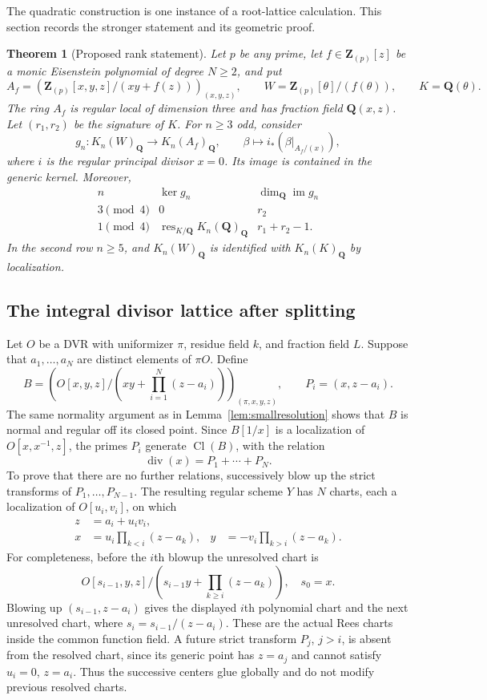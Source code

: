 \documentclass[11pt,a4paper]{article}
\newtheorem{theorem}{Theorem}[section]
\theoremstyle{remark}
\newcommand{\Q}{\mathbf Q}
\newcommand{\Z}{\mathbf Z}
\newcommand{\Cl}{\operatorname{Cl}}
\newcommand{\divisor}{\operatorname{div}}
\begin{document}
The quadratic construction is one instance of a root-lattice calculation. This section records the stronger statement and its geometric proof.

\begin{theorem}[Proposed rank statement]\label{thm:eisenstein}
Let $p$ be any prime, let $f\in\Z_{(p)}[z]$ be a monic Eisenstein polynomial of degree $N\geq2$, and put
\[
A_f=\left(\Z_{(p)}[x,y,z]/(xy+f(z))\right)_{(x,y,z)},\qquad
W=\Z_{(p)}[\theta]/(f(\theta)),\qquad K=\Q(\theta).
\]
The ring $A_f$ is regular local of dimension three and has fraction field $\Q(x,z)$. Let $(r_1,r_2)$ be the signature of $K$. For $n\geq3$ odd, consider
\[
g_n:K_n(W)_{\Q}\longrightarrow K_n(A_f)_{\Q},\qquad
\beta\longmapsto i_*(\beta|_{A_f/(x)}),
\]
where $i$ is the regular principal divisor $x=0$. Its image is contained in the generic kernel. Moreover,
\[
\begin{array}{c|c|c}
n&\ker g_n&\dim_{\Q}\operatorname{im}g_n\\ \hline
3\pmod4&0&r_2\\
1\pmod4&\operatorname{res}_{K/\Q}K_n(\Q)_{\Q}&r_1+r_2-1.
\end{array}
\]
In the second row $n\geq5$, and $K_n(W)_{\Q}$ is identified with $K_n(K)_{\Q}$ by localization.
\end{theorem}

\subsection{The integral divisor lattice after splitting}

Let $O$ be a DVR with uniformizer $\pi$, residue field $k$, and fraction field $L$. Suppose that $a_1,\ldots,a_N$ are distinct elements of $\pi O$. Define
\[
B=\left(O[x,y,z]/\left(xy+\prod_{i=1}^N(z-a_i)\right)\right)_{(\pi,x,y,z)},
\qquad P_i=(x,z-a_i).
\]
The same normality argument as in Lemma~\ref{lem:smallresolution} shows that $B$ is normal and regular off its closed point. Since $B[1/x]$ is a localization of $O[x,x^{-1},z]$, the primes $P_i$ generate $\Cl(B)$, with the relation
\[
\divisor(x)=P_1+\cdots+P_N.
\]
To prove that there are no further relations, successively blow up the strict transforms of $P_1,\ldots,P_{N-1}$. The resulting regular scheme $Y$ has $N$ charts, each a localization of $O[u_i,v_i]$, on which
\begin{align*}
z&=a_i+u_i v_i,\\
x&=u_i\prod_{k<i}(z-a_k),&
y&=-v_i\prod_{k>i}(z-a_k).
\end{align*}
For completeness, before the $i$th blowup the unresolved chart is
\[
O[s_{i-1},y,z]/\left(s_{i-1}y+\prod_{k\geq i}(z-a_k)\right),
\quad s_0=x.
\]
Blowing up $(s_{i-1},z-a_i)$ gives the displayed $i$th polynomial chart and the next unresolved chart, where $s_i=s_{i-1}/(z-a_i)$. These are the actual Rees charts inside the common function field. A future strict transform $P_j$, $j>i$, is absent from the resolved chart, since its generic point has $z=a_j$ and cannot satisfy $u_i=0$, $z=a_i$. Thus the successive centers glue globally and do not modify previous resolved charts.
\end{document}
